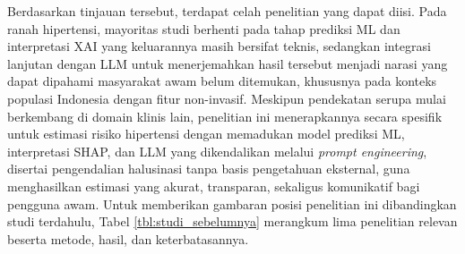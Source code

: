 Berdasarkan tinjauan tersebut, terdapat celah penelitian yang dapat diisi. Pada ranah hipertensi, mayoritas studi berhenti pada tahap prediksi ML dan interpretasi XAI yang keluarannya masih bersifat teknis, sedangkan integrasi lanjutan dengan LLM untuk menerjemahkan hasil tersebut menjadi narasi yang dapat dipahami masyarakat awam belum ditemukan, khususnya pada konteks populasi Indonesia dengan fitur non-invasif. Meskipun pendekatan serupa mulai berkembang di domain klinis lain, penelitian ini menerapkannya secara spesifik untuk estimasi risiko hipertensi dengan memadukan model prediksi ML, interpretasi SHAP, dan LLM yang dikendalikan melalui \emph{prompt engineering}, disertai pengendalian halusinasi tanpa basis pengetahuan eksternal, guna menghasilkan estimasi yang akurat, transparan, sekaligus komunikatif bagi pengguna awam. Untuk memberikan gambaran posisi penelitian ini dibandingkan studi terdahulu, Tabel \ref{tbl:studi_sebelumnya} merangkum lima penelitian relevan beserta metode, hasil, dan keterbatasannya.

\setlength\LTleft{0pt} 
\setlength\LTright{0pt}

\setlength{\LTpre}{0pt} 
\setlength{\LTpost}{0pt}

